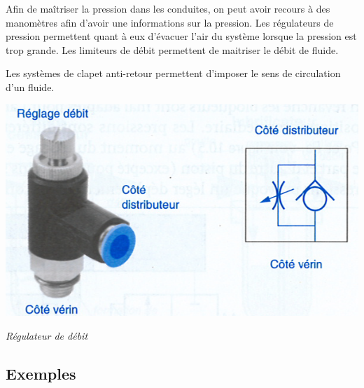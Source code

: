\documentclass[10pt]{article}
\begin{document}
\begin{minipage}[c]{.62\textwidth}
Afin de maîtriser la pression dans les conduites, on peut avoir recours à des manomètres afin d'avoir une informations sur la pression. Les régulateurs de pression permettent quant à eux d'évacuer l'air du système lorsque la pression est trop grande. Les limiteurs de débit permettent de maitriser le débit de fluide.

Les systèmes de clapet anti-retour permettent d'imposer le sens de circulation d'un fluide. 

\end{minipage} \hfill
\begin{minipage}[c]{.35\textwidth}
\begin{center}
\includegraphics[width=.95\textwidth]{images/fig5}

\textit{Régulateur de débit}
\end{center}
\end{minipage}


\subsection{Exemples}
\end{document}
